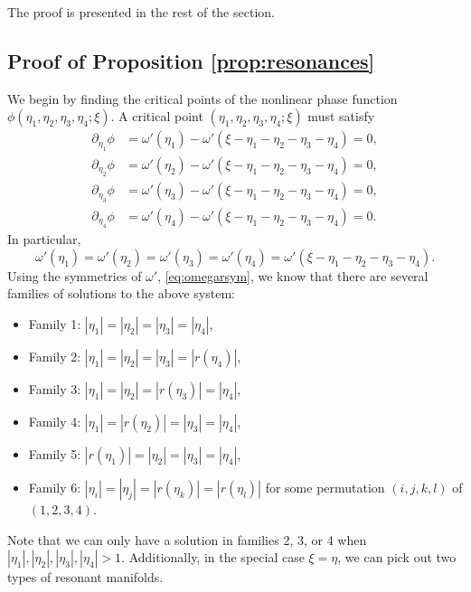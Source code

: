 \documentclass[reqno,english,11pt]{amsart}
\theoremstyle{definition}
\numberwithin{equation}{section}
\begin{document}
The proof is presented in the rest of the section. \subsection{Proof of Proposition \ref{prop:resonances}}
We begin by finding the critical points of the nonlinear phase function $\phi(\eta_1,\eta_2,\eta_3,\eta_4; \xi)$. A critical point $(\eta_1,\eta_2,\eta_3,\eta_4;\xi)$ must satisfy
    \begin{align*}
        \partial_{\eta_{1}}\phi &= \omega'(\eta_{1})-\omega'(\xi-\eta_{1}-\eta_{2}-\eta_{3}-\eta_4) = 0,
        \\
        \partial_{\eta_{2}}\phi &= \omega'(\eta_{2})-\omega'(\xi-\eta_{1}-\eta_{2}-\eta_{3}-\eta_4) = 0,
        \\
        \partial_{\eta_{3}}\phi &= \omega'(\eta_{3})-\omega'(\xi-\eta_{1}-\eta_{2}-\eta_{3}-\eta_{4}) = 0,
        \\
        \partial_{\eta_{4}}\phi &= \omega'(\eta_{4})-\omega'(\xi-\eta_{1}-\eta_{2}-\eta_{3}-\eta_{4}) = 0.
    \end{align*}
    In particular,
    $$
    \omega'(\eta_{1}) = \omega'(\eta_{2}) = \omega'(\eta_{3}) = \omega'(\eta_{4}) = \omega'(\xi-\eta_{1}-\eta_{2}-\eta_{3}-\eta_{4}) . 
    $$
Using the symmetries of $\omega'$, \eqref{eq:omegarsym}, we know that there are several families of solutions to the above system:
\begin{itemize}
\item Family 1: $|\eta_{1}|=|\eta_{2}|=|\eta_{3}|=|\eta_{4}|$,
\item Family 2: $|\eta_{1}|=|\eta_{2}|=|\eta_{3}|=|r\left(\eta_{4}\right)|$,
\item Family 3: $|\eta_{1}|=|\eta_{2}|=|r\left(\eta_{3}\right)|=|\eta_{4}|$,
\item Family 4: $|\eta_{1}|=|r\left(\eta_{2}\right)|=|\eta_{3}|=|\eta_{4}|$,
\item Family 5:
$|r\left(\eta_{1}\right)|=|\eta_{2}|=|\eta_{3}|=|\eta_{4}|$,
\item Family 6: $|\eta_i| = |\eta_j| = |r(\eta_k)| = |r(\eta_l)|$ for some permutation $(i,j,k,l)$ of $(1,2,3,4)$.
\end{itemize}
Note that we can only have a solution in families 2, 3, or 4 when $|\eta_{1}|, |\eta_{2}|, |\eta_{3}|, |\eta_{4}| >1$. 
Additionally, in the special case $\xi=\eta$, we can pick out two types of resonant manifolds. 
\end{document}
